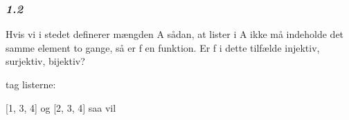 \documentclass{article}
\begin{document}
\subsubsection{\textbf{\textit{1.2}}}
\begin{Maple Normal}{
Hvis vi i stedet definerer mængden A sådan, at lister i A ikke må\linebreak
indeholde det samme element to gange, så er f en funktion. Er f i\linebreak
dette tilfælde injektiv, surjektiv, bijektiv?\linebreak
{}
}\end{Maple Normal}
\begin{Maple Normal}{
tag listerne:}\end{Maple Normal}

\begin{Maple Normal}{
[1, 3, 4] og [2, 3, 4] saa vil}\end{Maple Normal}
\end{document}
